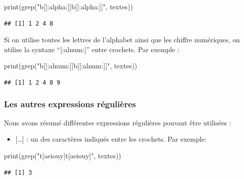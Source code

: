 \documentclass[
]{book}
\newenvironment{Shaded}{\begin{snugshade}}{\end{snugshade}}
\newcommand{\FunctionTok}[1]{\textcolor[rgb]{0.00,0.00,0.00}{#1}}
\newcommand{\NormalTok}[1]{#1}
\newcommand{\StringTok}[1]{\textcolor[rgb]{0.31,0.60,0.02}{#1}}
\providecommand{\tightlist}{%
  \setlength{\itemsep}{0pt}\setlength{\parskip}{0pt}}
\theoremstyle{definition}
\theoremstyle{definition}
\theoremstyle{definition}
\theoremstyle{definition}
\theoremstyle{remark}
\begin{document}
\begin{Shaded}
\begin{Highlighting}[]
\FunctionTok{print}\NormalTok{(}\FunctionTok{grep}\NormalTok{(}\StringTok{"b[[:alpha:]]b[[:alpha:]]"}\NormalTok{, textes))}
\end{Highlighting}
\end{Shaded}

\begin{verbatim}
## [1] 1 2 4 8
\end{verbatim}

Si on utilise toutes les lettres de l'alphabet ainsi que les chiffre numériques, on utilise la syntaxe ``{[}:alnum:{]}'' entre crochets. Par exemple :

\begin{Shaded}
\begin{Highlighting}[]
\FunctionTok{print}\NormalTok{(}\FunctionTok{grep}\NormalTok{(}\StringTok{"b[[:alnum:]]b[[:alnum:]]"}\NormalTok{, textes))}
\end{Highlighting}
\end{Shaded}

\begin{verbatim}
## [1] 1 2 4 8 9
\end{verbatim}

\hypertarget{les-autres-expressions-ruxe9guliuxe8res}{%
\subsubsection{Les autres expressions régulières}\label{les-autres-expressions-ruxe9guliuxe8res}}

Nous avons résumé différentes expressions régulières pouvant être utilisées :

\begin{itemize}
\tightlist
\item
  {[}\ldots{]} : un des caractères indiqués entre les crochets. Par exemple:
\end{itemize}

\begin{Shaded}
\begin{Highlighting}[]
\FunctionTok{print}\NormalTok{(}\FunctionTok{grep}\NormalTok{(}\StringTok{"t[aeiouy]t[aeiouy]"}\NormalTok{, textes))}
\end{Highlighting}
\end{Shaded}

\begin{verbatim}
## [1] 3
\end{verbatim}
\end{document}
